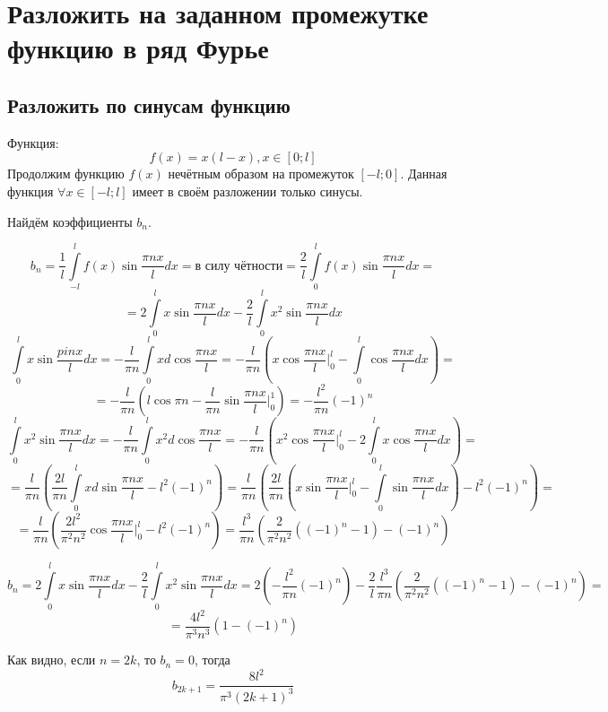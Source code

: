 \documentclass[12pt]{scrartcl}
\begin{document}
\section{Разложить на заданном промежутке функцию в ряд Фурье}
\subsection{Разложить по синусам функцию}
Функция:
$$f\left(x\right) = x\left(l-x\right), x\in\left[0;l\right]$$
Продолжим функцию $f\left(x\right)$ нечётным образом на промежуток $\left[-l;0\right]$.
Данная функция $\forall x\in\left[-l;l\right]$ имеет в своём разложении только синусы.

Найдём коэффициенты $b_n$.

$$b_n = \frac{1}{l}\int\limits_{-l}^l f\left(x\right) \sin\frac{\pi n x}{l} dx = \text{в силу чётности} = \frac{2}{l}\int\limits_0^l f\left(x\right) \sin\frac{\pi n x}{l} dx =$$
$$=2\int\limits_0^l x\sin\frac{\pi n x}{l} dx - \frac{2}{l}\int\limits_0^l x^2 \sin\frac{\pi n x}{l} dx$$
$$\int\limits_0^l x \sin\frac{pi n x}{l} dx = -\frac{l}{\pi n}\int\limits_0^l x d\cos\frac{\pi n x}{l} = -\frac{l}{\pi n}\left(x\cos\frac{\pi n x}{l} \Bigr|_0^l - \int\limits_0^l \cos\frac{\pi n x}{l} dx \right) =$$
$$= -\frac{l}{\pi n}\left(l\cos{\pi n} - \frac{l}{\pi n}\sin\frac{\pi n x}{l}\Bigr|_0^1\right) = -\frac{l^2}{\pi n}\left(-1\right)^n$$
$$\int\limits_0^l x^2\sin\frac{\pi n x}{l} dx = -\frac{l}{\pi n}\int\limits_0^l x^2 d\cos\frac{\pi n x}{l} = -\frac{l}{\pi n}\left(x^2\cos\frac{\pi n x}{l}\Bigr|_0^l - 2\int\limits_0^l x\cos\frac{\pi n x}{l} dx\right)=$$
$$=\frac{l}{\pi n}\left(\frac{2l}{\pi n}\int\limits_0^l x d\sin\frac{\pi n x}{l} - l^2\left(-1\right)^n\right) = \frac{l}{\pi n}\left(\frac{2 l}{\pi n}\left(x\sin\frac{\pi n x}{l}\Bigr|_0^l - \int\limits_0^l \sin\frac{\pi n x}{l} dx\right) - l^2\left(-1\right)^n\right)=$$
$$= \frac{l}{\pi n}\left(\frac{2l^2}{\pi^2 n^2}\cos\frac{\pi n x}{l}\Bigr|_0^l - l^2\left(-1\right)^n\right) = \frac{l^3}{\pi n}\left(\frac{2}{\pi^2 n^2}\left(\left(-1\right)^n - 1\right) - \left(-1\right)^n\right)$$

$$b_n = 2\int\limits_0^l x\sin\frac{\pi n x}{l} dx - \frac{2}{l}\int\limits_0^l x^2 \sin\frac{\pi n x}{l} dx = 2\left(-\frac{l^2}{\pi n}\left(-1\right)^n\right) - \frac{2}{l}\frac{l^3}{\pi n}\left(\frac{2}{\pi^2 n^2}\left(\left(-1\right)^n-1\right)-\left(-1\right)^n\right)=$$
$$=\frac{4l^2}{\pi^3 n^3}\left(1-\left(-1\right)^n\right)$$

Как видно, если $n = 2k$, то $b_n = 0$, тогда
$$b_{2k+1} = \frac{8l^2}{\pi^3 \left(2k+1\right)^3}$$
\end{document}
